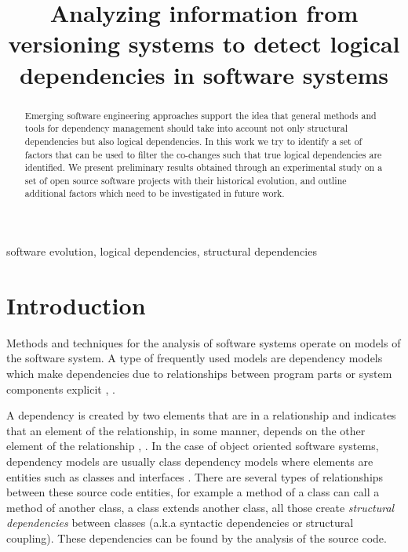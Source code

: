 \documentclass[conference]{IEEEtran}
\begin{document}
\title{Analyzing information from versioning systems to detect logical dependencies in software systems}

\author{
\and
{}

}


\maketitle

\begin{abstract}
Emerging software engineering approaches support the idea that general methods and tools for dependency management should take into account not only structural dependencies but also logical dependencies. In this work we try to identify a set of factors that can be used to filter the co-changes such that true logical dependencies are identified. We present preliminary results obtained through an experimental study on a set of open source software projects with their historical evolution, and outline additional factors which need to be investigated in future work.
\end{abstract}

\begin{IEEEkeywords}
software evolution, logical dependencies, structural dependencies
\end{IEEEkeywords}

\section{Introduction}


Methods and techniques for the analysis of software systems operate on models of the software system. A type of frequently used models are dependency models which make dependencies due to relationships between program parts or system components explicit \cite{CalloArias2011}, \cite{Sangal:2005:UDM:1094811.1094824}.

A dependency is created by two elements that are in a relationship and indicates that an element of the relationship, in some manner, depends on the other element of the relationship \cite{Booch:2004:OAD:975416}, \cite{Cataldo2009SoftwareDW}. In the case of object oriented software systems, dependency models are usually class dependency models where elements are entities such as classes and interfaces \cite{Sangal:2005:UDM:1094811.1094824}. There are several types of relationships between these source code entities, for example a method of a class can call a method of another class, a class extends another class, all those create  \textit{structural dependencies} between classes (a.k.a syntactic dependencies or structural coupling). These dependencies can be found by the analysis of the source code.
\end{document}
